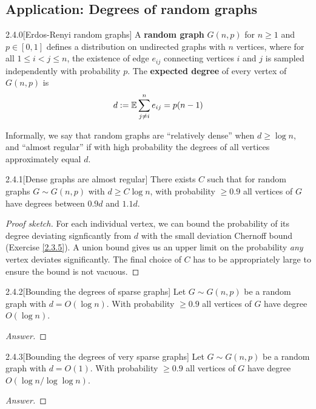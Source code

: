{\newpage
\subsection{Application: Degrees of random graphs} %

\begin{defn}{2.4.0}[Erdos-Renyi random graphs]\label{2.4.0}
A \textbf{random graph} $G(n,p)$ for $n\geq 1$ and $p \in [0,1]$ defines a distribution on undirected graphs with $n$ vertices, where for all $1 \leq i < j \leq n$, the existence of edge $e_{ij}$ connecting vertices $i$ and $j$ is sampled independently with probability $p$. The \textbf{expected degree} of every vertex of $G(n,p)$ is
\begin{align*}
    d := \mathbb{E} \sum_{j\neq i}^n e_{ij} = p(n-1)
\end{align*}
\end{defn}

Informally, we say that random graphs are ``relatively dense'' when $d\geq \log n$, and ``almost regular'' if with high probability the degrees of all vertices approximately equal $d$.

\begin{prop}{2.4.1}[Dense graphs are almost regular]\label{2.4.1}
There exists $C$ such that for random graphs $G \sim G(n,p)$ with $d \geq C\log n$, with probability $\geq 0.9$ all vertices of $G$ have degrees between $0.9d$ and $1.1d$.
\end{prop}
\begin{proof}[Proof sketch]
For each individual vertex, we can bound the probability of its degree deviating signficantly from $d$ with the small deviation Chernoff bound (Exercise \ref{2.3.5}). A union bound gives us an upper limit on the probability \textit{any} vertex deviates significantly. The final choice of $C$ has to be appropriately large to ensure the bound is not vacuous.
\end{proof}

\begin{ex}{2.4.2}[Bounding the degrees of sparse graphs]\label{2.4.2} 
Let $G \sim G(n,p)$ be a random graph with $d = O(\log n)$. With probability $\geq 0.9$ all vertices of $G$ have degree $O(\log n)$.
\end{ex}
\begin{proof}[Answer]
\end{proof}

\begin{ex}{2.4.3}[Bounding the degrees of very sparse graphs]\label{2.4.3} 
Let $G \sim G(n,p)$ be a random graph with $d = O(1)$. With probability $\geq 0.9$ all vertices of $G$ have degree $O(\log n/\log\log n)$.
\end{ex}
\begin{proof}[Answer]
\end{proof}

}
